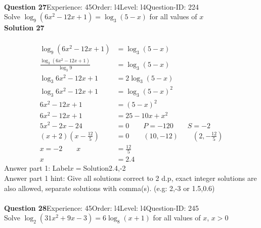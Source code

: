 \documentclass{article}
\begin{document}
\\[4pt]
\noindent\textbf{Question 27}\hspace{20pt}Experience: 45\hspace{20pt}Order: l4\hspace{20pt}Level: l4\hspace{20pt}Question-ID: 224\\[2pt]
Solve $\log_{9}(6x^2-12x+1)=\log_{3}(5-x)$ for all values of $x$\\[4pt]
\noindent\textbf{Solution 27}\\[2pt]
\\[-35pt]\begin{align*}
\log_{9}(6x^2-12x+1)&=\log_{3}(5-x)\\[2pt]
\displaystyle\frac{\log_{3}(6x^2-12x+1)}{\log_{3}9}&=\log_{3}(5-x)\\[2pt]
\log_{3}6x^2-12x+1&=2\log_{3}(5-x)\\[2pt]
\log_{3}6x^2-12x+1&=\log_{3}(5-x)^2\\[2pt]
6x^2-12x+1&=(5-x)^2\\[2pt]
6x^2-12x+1&=25-10x+x^2\\[2pt]
5x^2-2x-24&=0\qquad P=-120 \qquad S=-2\\[2pt]
(x+2)\left(x-\displaystyle\frac{12}{5}\right)&=0\qquad (10,-12) \qquad \left(2,-\displaystyle\frac{12}{5}\right)\\[2pt]
x=-2\qquad x&=\displaystyle\frac{12}{5}\\[2pt]
x&=2.4
\end{align*}
Answer part 1: \hspace{10pt}Label\hspace{10pt}$x=$\hspace{10pt}Solution\hspace{10pt}2.4,-2\\
Answer part 1 hint: \hspace{15pt} Give all solutions correct to 2 d.p, exact integer solutions are also allowed, separate solutions with comma(s). (e.g: 2,-3 or 1.5,0.6)\\
\\[4pt]
\noindent\textbf{Question 28}\hspace{20pt}Experience: 45\hspace{20pt}Order: l4\hspace{20pt}Level: l4\hspace{20pt}Question-ID: 245\\[2pt]
Solve $\log_{2}(31x^2+9x-3)=6\log_{8}(x+1)$ for all values of $x$, $x>0$\\[4pt]
\end{document}
